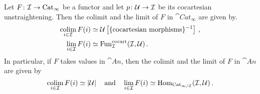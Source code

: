 \begin{lem}\label{lem:ColimitsInAnima}
	Let $F\colon \mathcal{I}\rightarrow \mathrm{Cat}_\infty$ be a functor and let $p\colon \mathcal{U}\rightarrow \mathcal{I}$ be its cocartesian unstraightening. Then the colimit and the limit of $F$ in $\cat{Cat}_\infty$ are given by.
	\begin{align*}
		\operatorname*{colim}_{i\in\mathcal{I}}F(i)&\simeq \mathcal{U}\left[\{\text{cocartesian morphisms}\}^{-1}\right]\,,\\
		\operatorname*{lim}_{i\in\mathcal{I}}F(i)&\simeq \operatorname{Fun}_{\mathcal{I}}^\mathrm{cocart}(\mathcal{I},\mathcal{U})\,.
	\end{align*}
	In particular, if $F$ takes values in $\cat{An}$, then the colimit and the limit of $F$ in $\cat{An}$ are given by
	\begin{equation*}
		\operatorname*{colim}_{i\in\mathcal{I}}F(i)\simeq \left|\mathcal{U}\right|\quad\text{and}\quad \operatorname*{lim}_{i\in\mathcal{I}}F(i)\simeq \operatorname{Hom}_{\mathrm{Cat}_{\infty/\mathcal{I}}}(\mathcal{I},\mathcal{U})\,.
	\end{equation*}
\end{lem}
